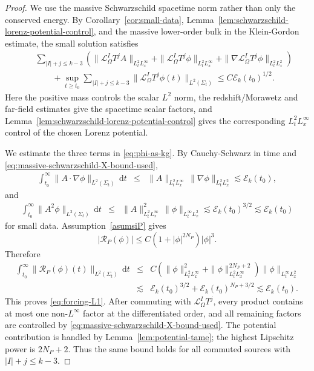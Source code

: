 \documentclass[11pt]{article}
\numberwithin{equation}{section}
\theoremstyle{plain}
\theoremstyle{definition}
\theoremstyle{remark}
\newcommand{\dd}{\mathrm{d}}
\begin{document}
\begin{proof}
We use the massive Schwarzschild spacetime norm rather than only the conserved energy.  By Corollary~\ref{cor:small-data}, Lemma~\ref{lem:schwarzschild-lorenz-potential-control}, and the massive lower-order bulk in the Klein-Gordon estimate, the small solution satisfies
\begin{eqnarray}\label{eq:massive-schwarzschild-X-bound-used}
&&\sum_{|I|+j\le k-3}
\left(
 \|\mathcal L_\Omega^I T^j A\|_{L^2_tL^\infty_x}
 +\|\mathcal L_\Omega^I T^j \phi\|_{L^2_tL^\infty_x}
 +\|\nabla\mathcal L_\Omega^I T^j\phi\|_{L^2_tL^2_x}
\right)
\nonumber\\
&&\qquad+
\sup_{t\ge t_0}\sum_{|I|+j\le k-3}
\|\mathcal L_\Omega^I T^j\phi(t)\|_{L^2(\Sigma_t)}
\le C\mathcal E_k(t_0)^{1/2}.
\end{eqnarray}
Here the positive mass controls the scalar \(L^2\) norm, the redshift/Morawetz and far-field estimates give the spacetime scalar factors, and Lemma~\ref{lem:schwarzschild-lorenz-potential-control} gives the corresponding \(L^2_tL^\infty_x\) control of the chosen Lorenz potential.

We estimate the three terms in \eqref{eq:phi-as-kg}.  By Cauchy-Schwarz in time and \eqref{eq:massive-schwarzschild-X-bound-used},
\begin{eqnarray}
\int_{t_0}^{\infty}\|A\cdot\nabla\phi\|_{L^2(\Sigma_t)}\,\dd t
&\le&
\|A\|_{L^2_tL^\infty_x}\,\|\nabla\phi\|_{L^2_tL^2_x}
\lesssim \mathcal E_k(t_0),
\end{eqnarray}
and
\begin{eqnarray}
\int_{t_0}^{\infty}\|A^2\phi\|_{L^2(\Sigma_t)}\,\dd t
&\le&
\|A\|_{L^2_tL^\infty_x}^{2}\,\|\phi\|_{L^\infty_tL^2_x}
\lesssim \mathcal E_k(t_0)^{3/2}
\lesssim \mathcal E_k(t_0)
\end{eqnarray}
for small data.  Assumption~\ref{asumsiP} gives
\begin{equation}
 |\mathcal R_P(\phi)|\le C(1+|\phi|^{2N_P})|\phi|^3.
\end{equation}
Therefore
\begin{eqnarray}
\int_{t_0}^{\infty}\|\mathcal R_P(\phi)(t)\|_{L^2(\Sigma_t)}\,\dd t
&\le&
C\left(\|\phi\|_{L^2_tL^\infty_x}^{2}
+\|\phi\|_{L^2_tL^\infty_x}^{2N_P+2}\right)
\|\phi\|_{L^\infty_tL^2_x}
\nonumber\\
&\lesssim& \mathcal E_k(t_0)^{3/2}+\mathcal E_k(t_0)^{N_P+3/2}
\lesssim \mathcal E_k(t_0).
\end{eqnarray}
This proves \eqref{eq:forcing-L1}.  After commuting with \(\mathcal L_\Omega^I T^j\), every product contains at most one non-\(L^\infty\) factor at the differentiated order, and all remaining factors are controlled by \eqref{eq:massive-schwarzschild-X-bound-used}.  The potential contribution is handled by Lemma~\ref{lem:potential-tame}; the highest Lipschitz power is \(2N_P+2\).  Thus the same bound holds for all commuted sources with \(|I|+j\le k-3\).
\end{proof}
\end{document}
